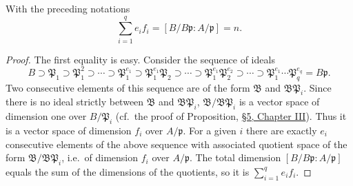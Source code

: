 \begin{theorem}
\label{thm:V.2.1}
With the preceding notations
\begin{equation}
\sum_{i=1}^{q}e_{i}f_{i}=[B/B\mathfrak{p}:A/\mathfrak{p}]=n.
\label{eq:V.2.2}
\end{equation}
\end{theorem}

\begin{proof}
The first equality is easy. Consider the sequence of ideals
\[
B\supset\mathfrak{P}_{1}\supset\mathfrak{P}_{1}^{2}\supset\cdots\supset
\mathfrak{P}_{1}^{e_{1}}\supset
\mathfrak{P}_{1}^{e_{1}}\mathfrak{P}_{2}\supset\cdots\supset
\mathfrak{P}_{1}^{e_{1}}\mathfrak{P}_{2}^{e_{2}}\supset\cdots\supset
\mathfrak{P}_{1}^{e_{1}}\cdots\mathfrak{P}_{q}^{e_{q}}=B\mathfrak{p}.
\]
Two consecutive elements of this sequence are of the form $\mathfrak{B}$ and
$\mathfrak{B}\mathfrak{P}_{i}$. Since there is no ideal strictly between
$\mathfrak{B}$ and $\mathfrak{B}\mathfrak{P}_{i}$,
$\mathfrak{B}/\mathfrak{B}\mathfrak{P}_{i}$ is a vector space of dimension
one over $B/\mathfrak{P}_{i}$ (cf.\ the proof of Proposition, \hyperref[sec:3.5]{§5, Chapter
III}). Thus it is a vector space of dimension $f_{i}$ over
$A/\mathfrak{p}$. For a given $i$ there are exactly $e_{i}$ consecutive
elements of the above sequence with associated quotient space of the form
$\mathfrak{B}/\mathfrak{B}\mathfrak{P}_{i}$, i.e.\ of dimension $f_{i}$ over
$A/\mathfrak{p}$. The total dimension
$[B/B\mathfrak{p}:A/\mathfrak{p}]$ equals the sum of the dimensions of the
quotients, so it is $\sum_{i=1}^{q}e_{i}f_{i}$.


\end{proof}
